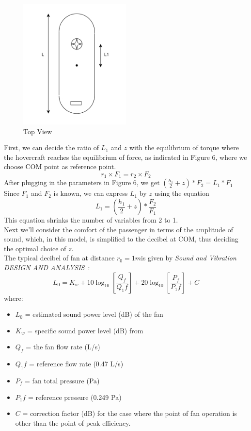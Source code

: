 \begin{figure}[H]
  \centering
  \includegraphics[width=0.5\textwidth,height=0.45\textwidth]{images/SideView.jpg}
  \caption{Top View}
  \label{fig:Top View}
\end{figure}



First, we can decide the ratio of $L_1$ and $z$ with the equilibrium of torque where the hovercraft reaches the equilibrium of force, as indicated in Figure 6, where we choose COM point as reference point.
\begin{equation}
r_1 \times F_1 = r_2 \times F_2
\end{equation}
After plugging in the parameters in Figure 6, we get 
$(\frac{h_1}{2}+z)*F_2=L_1*F_1$
Since $F_1$ and $F_2$ is known, we can express $L_1$ by $z$ using the equation
\begin{equation} 
L_1=(\frac{h_1}{2}+z)*\frac{F_2}{F_1}
\end{equation}
This equation shrinks the number of variables from 2 to 1.\\

Next we'll consider the comfort of the passenger in terms of the amplitude of sound, which, in this model, is simplified to the decibel at COM, thus deciding the optimal choice of $z$.\\
The typical decibel of fan at distance $r_0=1m$is given by \textit{Sound and Vibration DESIGN AND ANALYSIS}~\cite{national1994sound}:
\begin{equation} 
 L_0 = K_w + 10 \log_{10} \left[ \frac{Q_f}{Q_1f} \right] + 20 \log_{10} \left[ \frac{P_f}{P_1f} \right] + C
\end{equation}
where:

\begin{itemize}
\item $L_0$ = estimated sound power level (dB) of the fan
\item $K_w$ = specific sound power level (dB) from
\item $Q_f$ = the fan flow rate (L/s)
\item $Q_1f$ = reference flow rate (0.47 L/s)
\item $P_f$ = fan total pressure (Pa)
\item $P_1f$ = reference pressure (0.249 Pa)
\item $C$ = correction factor (dB) for the case where the point of fan operation is other than the point of peak efficiency. 
\end{itemize}

